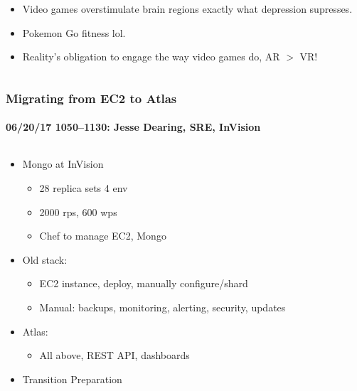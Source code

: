 \documentclass[xcolor=dvipsnames, 9pt]{beamer}
\begin{document}
\begin{frame}
\begin{columns}
\begin{column}{0.5\textwidth}
\begin{itemize}
\begin{itemize}
{                            depression.''}
                        \item Video games overstimulate brain regions exactly
                            what depression supresses.
                        \item Pokemon Go fitness lol.
                        \item Reality's obligation to engage the way video games
                            do, AR $>$ VR!%
                    \end{itemize}
            \end{itemize}
        \end{column}
    \end{columns}
\end{frame}

\begin{frame}
    \frametitle{Migrating from EC2 to Atlas}
    \framesubtitle{%
        06/20/17 1050--1130:
        Jesse Dearing, SRE, InVision
    }
    \begin{columns}
        \begin{column}{0.5\textwidth}
            \begin{itemize}
                \item Mongo at InVision
                    \begin{itemize}
                        \item 28 replica sets 4 env
                        \item 2000 rps, 600 wps
                        \item Chef to manage EC2, Mongo
                    \end{itemize}
                \item Old stack:
                    \begin{itemize}
                        \item EC2 instance, deploy, manually configure/shard
                        \item Manual: backups, monitoring, alerting, security, updates
                    \end{itemize}
                \item Atlas:
                    \begin{itemize}
                        \item All above, REST API, dashboards
                    \end{itemize}
                \item Transition Preparation

\end{itemize}
\end{column}
\end{columns}
\end{frame}
\end{document}
